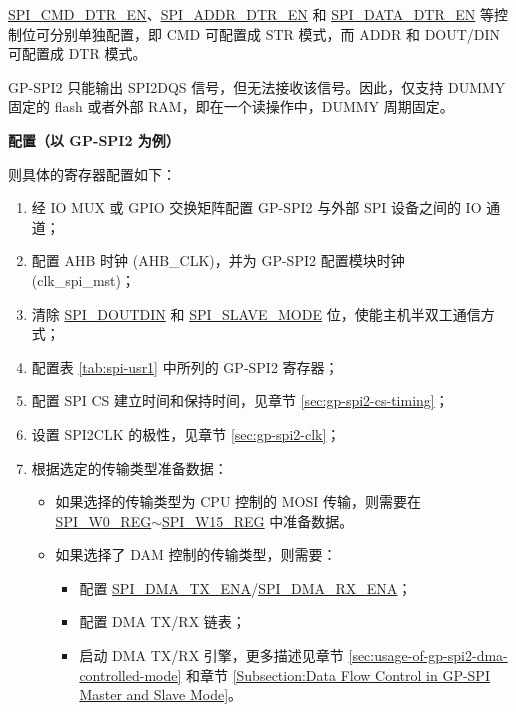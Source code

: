 \documentclass[main\_\_CN.tex]{subfiles}
\begin{document}
\hyperlink{fielddesc:SPICMDDTREN}{SPI\_CMD\_DTR\_EN}、\hyperlink{fielddesc:SPIADDRDTREN}{SPI\_ADDR\_DTR\_EN} 和 \hyperlink{fielddesc:SPIDATADTREN}{SPI\_DATA\_DTR\_EN} 等控制位可分别单独配置，即 CMD 可配置成 STR 模式，而 ADDR 和 DOUT/DIN 可配置成 DTR 模式。

GP-SPI2 只能输出 SPI2DQS 信号，但无法接收该信号。因此，仅支持 DUMMY 固定的 flash 或者外部 RAM，即在一个读操作中，DUMMY 周期固定。

\textbf{配置（以 GP-SPI2 为例）}

则具体的寄存器配置如下：
\begin{enumerate}
    \item 经 IO MUX 或 GPIO 交换矩阵配置 GP-SPI2 与外部 SPI 设备之间的 IO 通道； 
    \item 配置 AHB 时钟 (AHB\_CLK)，并为 GP-SPI2 配置模块时钟 (clk\_spi\_mst)；
    \item 清除 \hyperref[fielddesc:SPIDOUTDIN]{SPI\_DOUTDIN} 和 \hyperref[fielddesc:SPISLAVEMODE]{SPI\_SLAVE\_MODE} 位，使能主机半双工通信方式；    
    \item 配置表 \ref{tab:spi-usr1} 中所列的 GP-SPI2 寄存器；
    
    \item 配置 SPI CS 建立时间和保持时间，见章节 \ref{sec:gp-spi2-cs-timing}；
    
    \item 设置 SPI2CLK 的极性，见章节 \ref{sec:gp-spi2-clk}； 
    
    \item 根据选定的传输类型准备数据：
    \begin{itemize}
        \item 如果选择的传输类型为 CPU 控制的 MOSI 传输，则需要在 \hyperref[regdesc:SPIW0REG]{SPI\_W0\_REG}$\sim$\hyperref[regdesc:SPIW15REG]{SPI\_W15\_REG} 中准备数据。 
        
        \item 如果选择了 DAM 控制的传输类型，则需要： 
        \begin{itemize}
            \item 配置 \hyperref[fielddesc:SPIDMATXENA]{SPI\_DMA\_TX\_ENA}/\hyperref[fielddesc:SPIDMARXENA]{SPI\_DMA\_RX\_ENA}；
            \item 配置 DMA TX/RX 链表；
            \item 启动 DMA TX/RX 引擎，更多描述见章节 \ref{sec:usage-of-gp-spi2-dma-controlled-mode} 和章节 \ref{Subsection:Data Flow Control in GP-SPI Master and Slave Mode}。
        \end{itemize}
    \end{itemize}
    

\end{enumerate}
\end{document}
